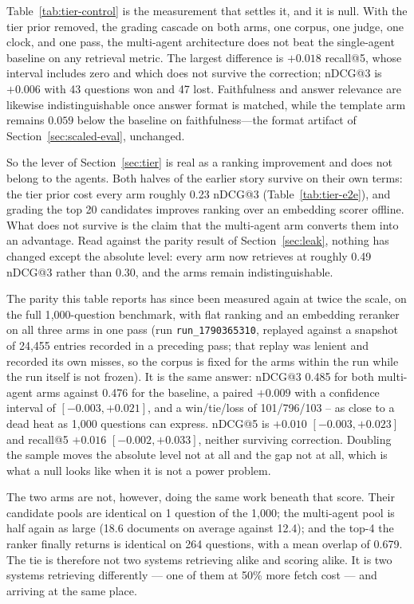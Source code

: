 \documentclass[acmsmall,review,anonymous,screen]{acmart}
\begin{document}
Table~\ref{tab:tier-control} is the measurement that settles it, and it is
null. With the tier prior removed, the grading cascade on both arms, one
corpus, one judge, one clock, and one pass, the multi-agent architecture does
not beat the single-agent baseline on any retrieval metric. The largest
difference is $+0.018$ recall@5, whose interval includes zero and which does
not survive the correction; nDCG@3 is $+0.006$ with 43 questions won and 47
lost. Faithfulness and answer relevance are likewise indistinguishable once
answer format is matched, while the template arm remains $0.059$ below the
baseline on faithfulness---the format artifact of
Section~\ref{sec:scaled-eval}, unchanged.

So the lever of Section~\ref{sec:tier} is real as a ranking improvement and
does not belong to the agents. Both halves of the earlier story survive on
their own terms: the tier prior cost every arm roughly 0.23 nDCG@3
(Table~\ref{tab:tier-e2e}), and grading the top 20 candidates improves ranking
over an embedding scorer offline. What does not survive is the claim that the
multi-agent arm converts them into an advantage. Read against the parity result
of Section~\ref{sec:leak}, nothing has changed except the absolute level: every
arm now retrieves at roughly 0.49 nDCG@3 rather than 0.30, and the arms remain
indistinguishable.

The parity this table reports has since been measured again at twice the scale,
on the full 1{,}000-question benchmark, with flat ranking and an embedding
reranker on all three arms in one pass (run \texttt{run\_1790365310}, replayed
against a snapshot of 24{,}455 entries recorded in a preceding pass; that replay
was lenient and recorded its own misses, so the corpus is fixed for the arms
within the run while the run itself is not frozen). It is the same answer: nDCG@3 0.485 for both
multi-agent arms against 0.476 for the baseline, a paired $+0.009$ with a
confidence interval of $[-0.003, +0.021]$, and a win/tie/loss of 101/796/103 --
as close to a dead heat as 1{,}000 questions can express. nDCG@5 is $+0.010$
$[-0.003, +0.023]$ and recall@5 $+0.016$ $[-0.002, +0.033]$, neither surviving
correction. Doubling the sample moves the absolute level not at all and the gap
not at all, which is what a null looks like when it is not a power problem.

The two arms are not, however, doing the same work beneath that score. Their
candidate pools are identical on 1 question of the 1{,}000; the multi-agent pool
is half again as large (18.6 documents on average against 12.4); and the top-4
the ranker finally returns is identical on 264 questions, with a mean overlap of
0.679. The tie is therefore not two systems retrieving alike and scoring alike.
It is two systems retrieving differently --- one of them at 50\% more fetch cost
--- and arriving at the same place.
\end{document}
